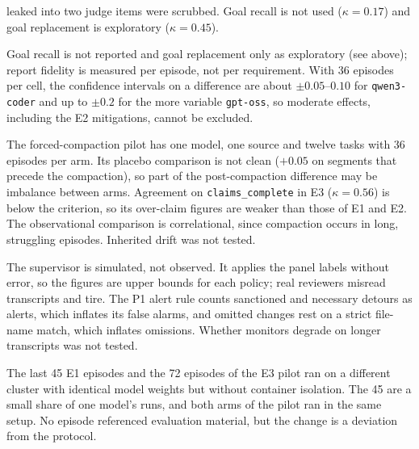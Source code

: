 \begin{description}[leftmargin=0pt]
        leaked into two judge items were scrubbed. Goal recall is not used ($\kappa=0.17$) and goal
        replacement is exploratory ($\kappa=0.45$).
  \item[Measures and power.] Goal recall is not reported and goal replacement only as exploratory
        (see above); report fidelity is measured per episode, not per requirement. With 36 episodes per
        cell, the confidence intervals on a difference are about $\pm 0.05$--$0.10$ for
        \texttt{qwen3-coder} and up to $\pm 0.2$ for the more variable \texttt{gpt-oss}, so moderate effects, including the E2
        mitigations, cannot be excluded.
  \item[E3.] The forced-compaction pilot has one model, one source and twelve tasks with 36
        episodes per arm. Its placebo comparison is not clean ($+0.05$ on segments that precede the
        compaction), so part of the post-compaction difference may be imbalance between arms.
        Agreement on \texttt{claims\_complete} in E3 ($\kappa=0.56$) is below the criterion, so its
        over-claim figures are weaker than those of E1 and E2. The observational comparison is
        correlational, since compaction occurs in long, struggling episodes. Inherited drift was
        not tested.
  \item[E4.] The supervisor is simulated, not observed. It applies the panel labels without error,
        so the figures are upper bounds for each policy; real reviewers misread transcripts and tire.
        The P1 alert rule counts sanctioned and necessary detours as alerts, which inflates its false
        alarms, and omitted changes rest on a strict file-name match, which inflates omissions.
        Whether monitors degrade on longer transcripts was not tested.
  \item[Infrastructure.] The last 45 E1 episodes and the 72 episodes of the E3 pilot ran on a
        different cluster with identical model weights but without container isolation. The 45 are a
        small share of one model's runs, and both arms of the pilot ran in the same setup. No episode
        referenced evaluation material, but the change is a deviation from the protocol.
\end{description}
